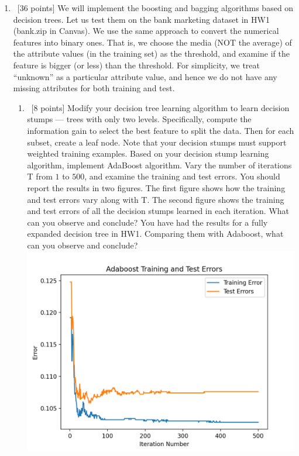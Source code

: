 \documentclass[12pt, fullpage,letterpaper]{article}
\begin{document}
\begin{enumerate}
\item~[36 points] We will implement the boosting and bagging algorithms based on decision trees.  Let us test them on the bank marketing dataset in HW1 (bank.zip in Canvas). We use the same approach to convert the numerical features into binary ones. That is, we choose the media (NOT the average) of the attribute values (in the training set) as the threshold, and examine if the feature is bigger (or less) than the threshold.  For simplicity, we treat ``unknown'' as a particular attribute value, and hence we do not have any missing attributes for both training and test.
\begin{enumerate}
	\item~[8 points] Modify your decision tree learning algorithm to learn decision stumps ---  trees with only two levels. Specifically, compute the information gain to select the best feature to split the data. Then for each subset, create a leaf node. Note that your decision stumps must support weighted training examples. Based on your decision stump learning algorithm, implement AdaBoost algorithm. Vary the number of iterations T from $1$ to $500$, and examine the training and test errors. You should report the results in two figures. The first figure shows how the training and test errors vary along with T. The second figure shows  the training and test errors of all the decision stumps learned in each iteration. What can you observe and conclude? You have had the results for a fully expanded decision tree in HW1. Comparing them with Adaboost, what can you observe and conclude?
	\newline
	\includegraphics[scale=0.8]{Adaboost.png}\newline

\end{enumerate}
\end{enumerate}
\end{document}

